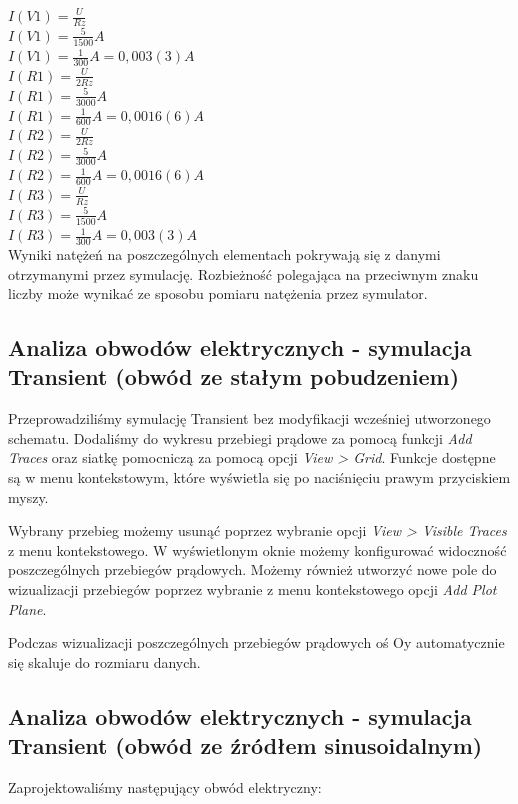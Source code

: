 \documentclass[polish,polish,a4paper]{article}
\begin{document}
$I(V1) = \frac{U}{Rz}$ \\
$I(V1) = \frac{5}{1500} A$ \\
$I(V1) = \frac{1}{300} A = 0,003(3) A$ \\
$I(R1) = \frac{U}{2Rz}$ \\
$I(R1) = \frac{5}{3000} A$ \\
$I(R1) = \frac{1}{600} A = 0,0016(6) A$ \\
$I(R2) = \frac{U}{2Rz}$ \\
$I(R2) = \frac{5}{3000} A$ \\
$I(R2) = \frac{1}{600} A = 0,0016(6) A$ \\
$I(R3) = \frac{U}{Rz}$ \\
$I(R3) = \frac{5}{1500} A$ \\
$I(R3) = \frac{1}{300} A = 0,003(3) A$ \\
Wyniki natężeń na poszczególnych elementach pokrywają się z danymi otrzymanymi przez symulację.
Rozbieżność polegająca na przeciwnym znaku liczby może wynikać ze sposobu pomiaru natężenia przez symulator. 

\subsection{Analiza obwodów elektrycznych - symulacja Transient (obwód ze stałym pobudzeniem)}

Przeprowadziliśmy symulację Transient bez modyfikacji wcześniej utworzonego schematu.
Dodaliśmy do wykresu przebiegi prądowe za pomocą funkcji \emph{Add Traces} oraz siatkę pomocniczą za pomocą opcji \emph{View > Grid}. Funkcje dostępne są w menu kontekstowym, które wyświetla się po naciśnięciu prawym przyciskiem myszy. 

Wybrany przebieg możemy usunąć poprzez wybranie opcji \emph{View > Visible Traces} z menu kontekstowego. W wyświetlonym oknie możemy konfigurować widoczność poszczególnych przebiegów prądowych. Możemy również utworzyć nowe pole do wizualizacji przebiegów poprzez wybranie z menu kontekstowego opcji \emph{Add Plot Plane}.

Podczas wizualizacji poszczególnych przebiegów prądowych oś Oy automatycznie się skaluje do rozmiaru danych.


\subsection{Analiza obwodów elektrycznych - symulacja Transient (obwód ze źródłem sinusoidalnym)}

Zaprojektowaliśmy następujący obwód elektryczny:
\end{document}
